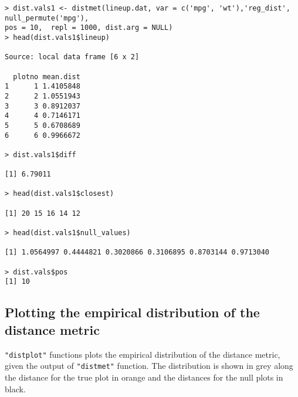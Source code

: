 \begin{verbatim}
> dist.vals1 <- distmet(lineup.dat, var = c('mpg', 'wt'),'reg_dist', null_permute('mpg'), 
pos = 10,  repl = 1000, dist.arg = NULL)
> head(dist.vals1$lineup)

Source: local data frame [6 x 2]

  plotno mean.dist
1      1 1.4105848
2      2 1.0551943
3      3 0.8912037
4      4 0.7146171
5      5 0.6708689
6      6 0.9966672

> dist.vals1$diff

[1] 6.79011

> head(dist.vals1$closest)

[1] 20 15 16 14 12

> head(dist.vals1$null_values)

[1] 1.0564997 0.4444821 0.3020866 0.3106895 0.8703144 0.9713040

> dist.vals$pos
[1] 10

\end{verbatim}


\subsection{Plotting the empirical distribution of the distance
metric}\label{plotting-the-empirical-distribution-of-the-distance-metric}

\texttt{"distplot"} functions plots the empirical distribution of the
distance metric, given the output of \texttt{"distmet"} function. The
distribution is shown in grey along the distance for the true plot in
orange and the distances for the null plots in black.

